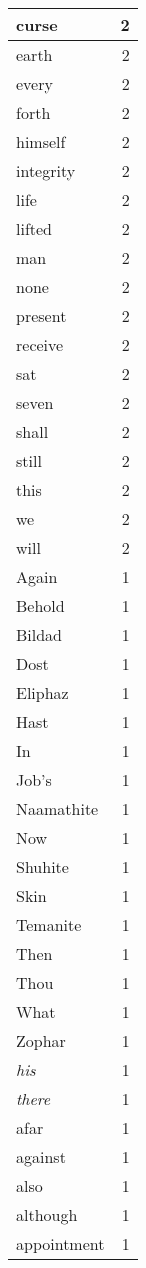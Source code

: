 \begin{center}
\begin{longtable}{l|r}
curse & 2 \\ \hline
earth & 2 \\ \hline
every & 2 \\ \hline
forth & 2 \\ \hline
himself & 2 \\ \hline
integrity & 2 \\ \hline
life & 2 \\ \hline
lifted & 2 \\ \hline
man & 2 \\ \hline
none & 2 \\ \hline
present & 2 \\ \hline
receive & 2 \\ \hline
sat & 2 \\ \hline
seven & 2 \\ \hline
shall & 2 \\ \hline
still & 2 \\ \hline
this & 2 \\ \hline
we & 2 \\ \hline
will & 2 \\ \hline
Again & 1 \\ \hline
Behold & 1 \\ \hline
Bildad & 1 \\ \hline
Dost & 1 \\ \hline
Eliphaz & 1 \\ \hline
Hast & 1 \\ \hline
In & 1 \\ \hline
Job's & 1 \\ \hline
Naamathite & 1 \\ \hline
Now & 1 \\ \hline
Shuhite & 1 \\ \hline
Skin & 1 \\ \hline
Temanite & 1 \\ \hline
Then & 1 \\ \hline
Thou & 1 \\ \hline
What & 1 \\ \hline
Zophar & 1 \\ \hline
\emph{his} & 1 \\ \hline
\emph{there} & 1 \\ \hline
afar & 1 \\ \hline
against & 1 \\ \hline
also & 1 \\ \hline
although & 1 \\ \hline
appointment & 1 \\ \hline

\end{longtable}
\end{center}
